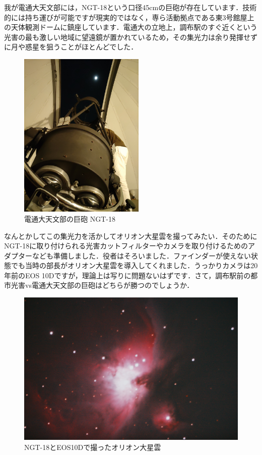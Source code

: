 \documentclass[../../super_nova_2023]{subfiles}
\begin{document}
我が電通大天文部には，NGT-18という口径45cmの巨砲が存在しています．技術的には持ち運びが可能ですが現実的ではなく，専ら活動拠点である東3号館屋上の天体観測ドームに鎮座しています．電通大の立地上，調布駅のすぐ近くという光害の最も激しい地域に望遠鏡が置かれているため，その集光力は余り発揮せずに月や惑星を狙うことがほとんどでした．
\begin{figure}[H]
	\centering
	\includegraphics[height=8cm, angle=-90]{figures/Yosuke/NGT-18.jpg}
	\caption{電通大天文部の巨砲 NGT-18}
	\label{fig:NGT-18}
\end{figure}
なんとかしてこの集光力を活かしてオリオン大星雲を撮ってみたい．そのためにNGT-18に取り付けられる光害カットフィルターやカメラを取り付けるためのアダプターなども準備しました．役者はそろいました．ファインダーが使えない状態でも当時の部長がオリオン大星雲を導入してくれました．うっかりカメラは20年前のEOS 10Dですが，理論上は写りに問題ないはずです．さて，調布駅前の都市光害vs電通大天文部の巨砲はどちらが勝つのでしょうか．
\begin{figure}[H]
	\centering
	\includegraphics[width=.8\textwidth, angle=180]{figures/Yosuke/2023_01_10_Orion_Chofu_NGT-18_5-Composit.jpg}
	\caption{NGT-18とEOS10Dで撮ったオリオン大星雲}
	\label{fig:NGTOrion}
\end{figure}
\end{document}
